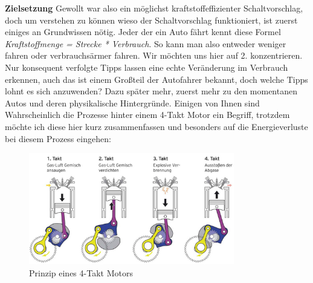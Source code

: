 \newpage
\textbf{Zielsetzung\newline}
Gewollt war also ein möglichst kraftstoffeffizienter Schaltvorschlag, doch um verstehen zu können wieso der Schaltvorschlag funktioniert, ist zuerst einiges an Grundwissen nötig.
Jeder der ein Auto fährt kennt diese Formel \textit{Kraftstoffmenge = Strecke * Verbrauch}. So kann man also entweder weniger fahren oder verbrauchsärmer fahren. Wir möchten uns hier auf 2. konzentrieren. Nur konsequent verfolgte Tipps lassen eine echte Veränderung im Verbrauch erkennen, auch das ist einem Großteil der Autofahrer bekannt, doch welche Tipps lohnt es sich anzuwenden? Dazu später mehr, zuerst mehr zu den momentanen Autos und deren physikalische Hintergründe.
Einigen von Ihnen sind Wahrscheinlich die Prozesse hinter einem 4-Takt Motor ein Begriff, trotzdem möchte ich diese hier kurz zusammenfassen und besonders auf die Energieverluste bei diesem Prozess eingehen:

\begin{figure}[!htb]\centering
	\includegraphics[width=0.8\textwidth]{images/viertaktMotorPrinzip}
	\caption{Prinzip eines 4-Takt Motors \cite{SIMR.CH2-motorwirkungsgrad.4strokeEngine}}\label{Fig:img4strokeEngine}
\end{figure}

